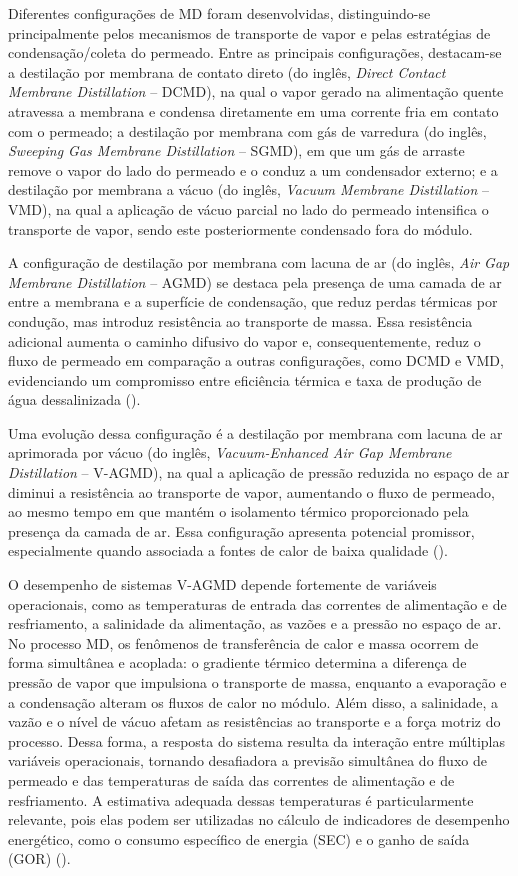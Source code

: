 Diferentes configurações de MD foram desenvolvidas, distinguindo-se principalmente pelos mecanismos de transporte de vapor e pelas estratégias de condensação/coleta do permeado. Entre as principais configurações, destacam-se a destilação por membrana de contato direto (do inglês, \textit{Direct Contact Membrane Distillation} -- DCMD), na qual o vapor gerado na alimentação quente atravessa a membrana e condensa diretamente em uma corrente fria em contato com o permeado; a destilação por membrana com gás de varredura (do inglês, \textit{Sweeping Gas Membrane Distillation} -- SGMD), em que um gás de arraste remove o vapor do lado do permeado e o conduz a um condensador externo; e a destilação por membrana a vácuo (do inglês, \textit{Vacuum Membrane Distillation} -- VMD), na qual a aplicação de vácuo parcial no lado do permeado intensifica o transporte de vapor, sendo este posteriormente condensado fora do módulo.

A configuração de destilação por membrana com lacuna de ar (do inglês, \textit{Air Gap Membrane Distillation} -- AGMD) se destaca pela presença de uma camada de ar entre a membrana e a superfície de condensação, que reduz perdas térmicas por condução, mas introduz resistência ao transporte de massa. Essa resistência adicional aumenta o caminho difusivo do vapor e, consequentemente, reduz o fluxo de permeado em comparação a outras configurações, como DCMD e VMD, evidenciando um compromisso entre eficiência térmica e taxa de produção de água dessalinizada (\cite{AlZoubi2018,Chong2022,Abid2020DesalinationOverview}).

Uma evolução dessa configuração é a destilação por membrana com lacuna de ar aprimorada por vácuo (do inglês, \textit{Vacuum-Enhanced Air Gap Membrane Distillation} -- V-AGMD), na qual a aplicação de pressão reduzida no espaço de ar diminui a resistência ao transporte de vapor, aumentando o fluxo de permeado, ao mesmo tempo em que mantém o isolamento térmico proporcionado pela presença da camada de ar. Essa configuração apresenta potencial promissor, especialmente quando associada a fontes de calor de baixa qualidade (\cite{Warsinger2017,Zewdie2020}).

O desempenho de sistemas V-AGMD depende fortemente de variáveis operacionais, como as temperaturas de entrada das correntes de alimentação e de resfriamento, a salinidade da alimentação, as vazões e a pressão no espaço de ar. No processo MD, os fenômenos de transferência de calor e massa ocorrem de forma simultânea e acoplada: o gradiente térmico determina a diferença de pressão de vapor que impulsiona o transporte de massa, enquanto a evaporação e a condensação alteram os fluxos de calor no módulo. Além disso, a salinidade, a vazão e o nível de vácuo afetam as resistências ao transporte e a força motriz do processo. Dessa forma, a resposta do sistema resulta da interação entre múltiplas variáveis operacionais, tornando desafiadora a previsão simultânea do fluxo de permeado e das temperaturas de saída das correntes de alimentação e de resfriamento. A estimativa adequada dessas temperaturas é particularmente relevante, pois elas podem ser utilizadas no cálculo de indicadores de desempenho energético, como o consumo específico de energia (SEC) e o ganho de saída (GOR) (\cite{Hitsov2015,Olatunji2018}).

